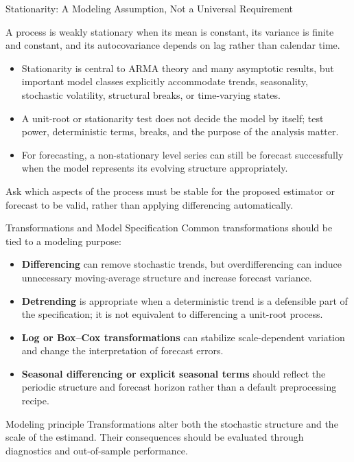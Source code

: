 \documentclass[aspectratio=169]{beamer}
\begin{document}
\begin{frame}{Stationarity: A Modeling Assumption, Not a Universal Requirement}
  \begin{definitionbox}[title={Weak (Covariance) Stationarity}]
    A process is weakly stationary when its mean is constant, its variance is finite and constant, and its autocovariance depends on lag rather than calendar time.
  \end{definitionbox}

  \vspace{0.5em}

  \begin{itemize}
    \item Stationarity is central to ARMA theory and many asymptotic results, but important model classes explicitly accommodate trends, seasonality, stochastic volatility, structural breaks, or time-varying states.
    \item A unit-root or stationarity test does not decide the model by itself; test power, deterministic terms, breaks, and the purpose of the analysis matter.
    \item For forecasting, a non-stationary level series can still be forecast successfully when the model represents its evolving structure appropriately.
  \end{itemize}

  \begin{alertbox}[title={Practical implication}]
    Ask which aspects of the process must be stable for the proposed estimator or forecast to be valid, rather than applying differencing automatically.
  \end{alertbox}
\end{frame}

\begin{frame}{Transformations and Model Specification}
  Common transformations should be tied to a modeling purpose:

  \begin{itemize}
    \item \textbf{Differencing} can remove stochastic trends, but overdifferencing can induce unnecessary moving-average structure and increase forecast variance.
    \item \textbf{Detrending} is appropriate when a deterministic trend is a defensible part of the specification; it is not equivalent to differencing a unit-root process.
    \item \textbf{Log or Box--Cox transformations} can stabilize scale-dependent variation and change the interpretation of forecast errors.
    \item \textbf{Seasonal differencing or explicit seasonal terms} should reflect the periodic structure and forecast horizon rather than a default preprocessing recipe.
  \end{itemize}

  \begin{block}{Modeling principle}
    Transformations alter both the stochastic structure and the scale of the estimand. Their consequences should be evaluated through diagnostics and out-of-sample performance.
  \end{block}
\end{frame}
\end{document}
